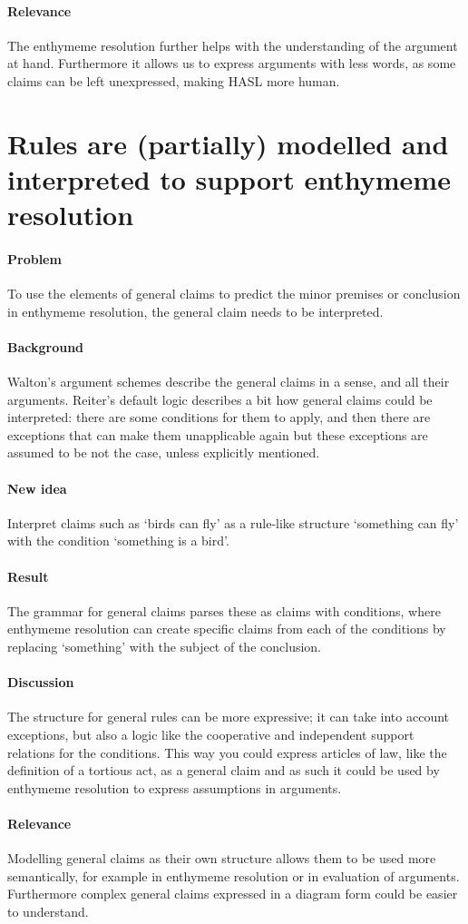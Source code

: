 \documentclass{article}
\let\stdsection\section
\renewcommand\section{\newpage\stdsection}
\begin{document}
\paragraph{Relevance} The enthymeme resolution further helps with the understanding of the argument at hand. Furthermore it allows us to express arguments with less words, as some claims can be left unexpressed, making HASL more human.

\section{Rules are (partially) modelled and interpreted to support enthymeme resolution}

\paragraph{Problem} To use the elements of general claims to predict the minor premises or conclusion in enthymeme resolution, the general claim needs to be interpreted.
\paragraph{Background} Walton's argument schemes describe the general claims in a sense, and all their arguments. Reiter's default logic describes a bit how general claims could be interpreted: there are some conditions for them to apply, and then there are exceptions that can make them unapplicable again but these exceptions are assumed to be not the case, unless explicitly mentioned.
\paragraph{New idea} Interpret claims such as `birds can fly' as a rule-like structure `something can fly' with the condition `something is a bird'.
\paragraph{Result} The grammar for general claims parses these as claims with conditions, where enthymeme resolution can create specific claims from each of the conditions by replacing `something' with the subject of the conclusion.
\paragraph{Discussion} The structure for general rules can be more expressive; it can take into account exceptions, but also a logic like the cooperative and independent support relations for the conditions. This way you could express articles of law, like the definition of a tortious act, as a general claim and as such it could be used by enthymeme resolution to express assumptions in arguments.
\paragraph{Relevance} Modelling general claims as their own structure allows them to be used more semantically, for example in enthymeme resolution or in evaluation of arguments. Furthermore complex general claims expressed in a diagram form could be easier to understand.
\end{document}
